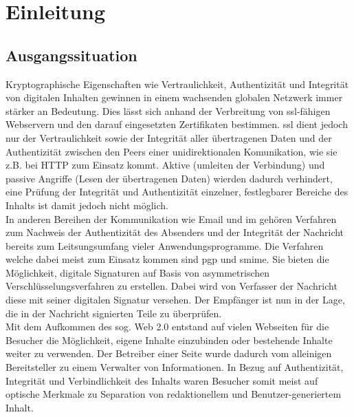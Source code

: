 
\chapter{Einleitung}
%
\label{chp:Einleitung}

\section{Ausgangssituation}
%
\label{sec:Einleitung:ausgangssituation}
Kryptographische Eigenschaften wie Vertraulichkeit, Authentizität und Integrität von digitalen Inhalten gewinnen in einem wachsenden globalen Netzwerk immer
stärker an Bedeutung. Dies lässt sich anhand der Verbreitung von \gls{ssl}-fähigen Webservern und den darauf eingesetzten Zertifikaten bestimmen. 
\gls{ssl} dient jedoch nur der Vertraulichkeit sowie der Integrität aller übertragenen Daten und der Authentizität zwischen den Peers einer unidirektionalen
Komunikation, wie sie z.B. bei HTTP zum Einsatz kommt. Aktive (umleiten der Verbindung) und passive Angriffe (Lesen der übertragenen Daten) wierden dadurch
verhindert, eine Prüfung der Integrität und Authentizität einzelner, festlegbarer Bereiche des Inhalts ist damit jedoch nicht möglich. \\

In anderen Bereihen der Kommunikation wie Email und \gls{im} gehören Verfahren zum Nachweis der Authentizität des Absenders und der Integrität der Nachricht
bereits zum Leitsungsumfang vieler Anwendungsprogramme. Die Verfahren welche dabei meist zum Einsatz kommen sind \gls{pgp} und \gls{smime}. Sie bieten die
Möglichkeit, digitale Signaturen auf Basis von asymmetrischen Verschlüsselungsverfahren zu erstellen. Dabei wird von Verfasser der Nachricht diese mit seiner
digitalen Signatur versehen. Der Empfänger ist nun in der Lage, die in der Nachricht signierten Teile zu überprüfen. \\

Mit dem Aufkommen des sog. Web 2.0 entstand auf vielen Webseiten für die Besucher die Möglichkeit, eigene Inhalte einzubinden oder bestehende Inhalte weiter zu
verwenden. Der Betreiber einer Seite wurde dadurch vom alleinigen Bereitsteller zu einem Verwalter von Informationen. In Bezug auf Authentizität, Integrität und
Verbindlichkeit des Inhalts waren Besucher somit meist auf optische Merkmale zu Separation von redaktionellem und Benutzer-generiertem Inhalt. \\

